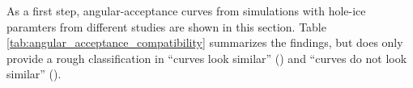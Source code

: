 As a first step, angular-acceptance curves from simulations with hole-ice paramters from different studies are shown in this section. Table \ref{tab:angular_acceptance_compatibility} summarizes the findings, but does only provide a rough classification in \enquote{curves look similar} (\ok) and \enquote{curves do not look similar} (\bad).

\begin{table}
  \begin{center}
\end{center}
\end{table}
